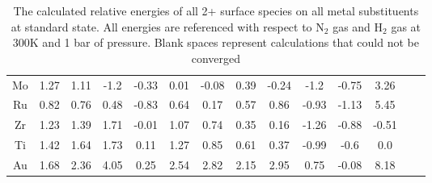 \begin{table}
\begin{center}
\begin{tabular}{| c | c | c | c | c | c | c | c | c | c | c | c | c | c |}
Mo & 1.27 & 1.11 & -1.2 & -0.33 & 0.01 & -0.08 & 0.39 & -0.24 & -1.2 & -0.75 & 3.26 \\
Ru & 0.82 & 0.76 & 0.48 & -0.83 & 0.64 & 0.17 & 0.57 & 0.86 & -0.93 & -1.13 & 5.45 \\
Zr & 1.23 & 1.39 & 1.71 & -0.01 & 1.07 & 0.74 & 0.35 & 0.16 & -1.26 & -0.88 & -0.51 \\
Ti & 1.42 & 1.64 & 1.73 & 0.11 & 1.27 & 0.85 & 0.61 & 0.37 & -0.99 & -0.6 & 0.0 \\
Au & 1.68 & 2.36 & 4.05 & 0.25 & 2.54 & 2.82 & 2.15 & 2.95 & 0.75 & -0.08 & 8.18 \\
\hline
\end{tabular}
\end{center}
\caption{The calculated relative energies of all 2+ surface species on all metal substituents at standard state. All energies are referenced with respect to N$_2$ gas and H$_2$ gas at 300K and 1 bar of pressure. Blank spaces represent calculations that could not be converged}
\label{table:energies}
\end{table}

